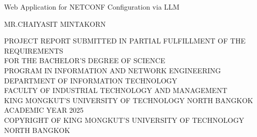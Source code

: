 \newpage
\thispagestyle{empty}
\begin{center}


Web Application for NETCONF Configuration via LLM      %


\vspace{80mm}
MR.CHAIYASIT MINTAKORN      %
\vspace{84mm}   





PROJECT REPORT SUBMITTED IN PARTIAL FULFILLMENT OF THE REQUIREMENTS\\

FOR THE BACHELOR’S DEGREE OF SCIENCE\\
PROGRAM IN INFORMATION AND NETWORK ENGINEERING\\



DEPARTMENT OF INFORMATION TECHNOLOGY\\
FACULTY OF INDUSTRIAL TECHNOLOGY AND MANAGEMENT\\
KING MONGKUT’S UNIVERSITY OF TECHNOLOGY NORTH BANGKOK\\
ACADEMIC YEAR 2025\\
COPYRIGHT OF KING MONGKUT’S UNIVERSITY OF TECHNOLOGY NORTH BANGKOK

\end{center}